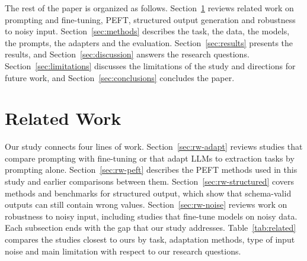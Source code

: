 \documentclass[journal,article,submit,pdftex,moreauthors]{Definitions/mdpi}
\begin{document}
The rest of the paper is organized as follows. Section~\ref{sec:related} reviews related work on prompting and fine-tuning, PEFT, structured output generation and robustness to noisy input. Section~\ref{sec:methods} describes the task, the data, the models, the prompts, the adapters and the evaluation. Section~\ref{sec:results} presents the results, and Section~\ref{sec:discussion} answers the research questions. Section~\ref{sec:limitations} discusses the limitations of the study and directions for future work, and Section~\ref{sec:conclusions} concludes the paper.

\section{Related Work}\label{sec:related}

Our study connects four lines of work. Section~\ref{sec:rw-adapt} reviews studies that compare prompting with fine-tuning or that adapt LLMs to extraction tasks by prompting alone. Section~\ref{sec:rw-peft} describes the PEFT methods used in this study and earlier comparisons between them. Section~\ref{sec:rw-structured} covers methods and benchmarks for structured output, which show that schema-valid outputs can still contain wrong values. Section~\ref{sec:rw-noise} reviews work on robustness to noisy input, including studies that fine-tune models on noisy data. Each subsection ends with the gap that our study addresses. Table~\ref{tab:related} compares the studies closest to ours by task, adaptation methods, type of input noise and main limitation with respect to our research questions.
\end{document}
